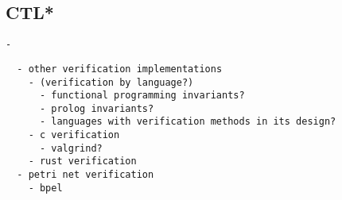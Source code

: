 \subsection{CTL*}
\label{rel_ctl}
\begin{verbatim}
- 
\end{verbatim}


\begin{verbatim}
  - other verification implementations
    - (verification by language?)
      - functional programming invariants?
      - prolog invariants?
      - languages with verification methods in its design?
    - c verification
      - valgrind?
    - rust verification
  - petri net verification
    - bpel
\end{verbatim}